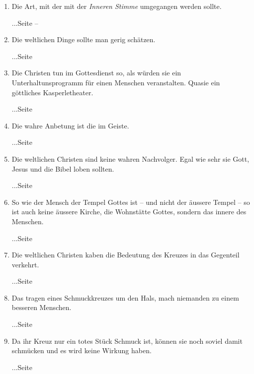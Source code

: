 \begin{enumerate}
 \item Die Art, mit der mit der \textit{Inneren Stimme} umgegangen werden
sollte.
 \begin{flushright}...Seite \pageref{ref:04_23_innere_stimme} --
\pageref{ref:04_23_innere_stimme_ende}\end{flushright}
 \item Die weltlichen Dinge sollte man gerig schätzen.
 \begin{flushright}...Seite \pageref{ref:04_23_dinge_der_welt}\end{flushright}
 \item Die Christen tun im Gottesdienst so, als würden sie ein
Unterhaltunsprogramm
 für einen Menschen veranstalten. Quasie ein göttliches Kasperletheater.
 \begin{flushright}...Seite \pageref{ref:05_02_kasperletheater}\end{flushright}
 \item Die wahre Anbetung ist die im Geiste.
 \begin{flushright}...Seite \pageref{ref:05_04_wahre_anbetung}\end{flushright}
 \item Die weltlichen Christen sind keine wahren Nachvolger. Egal wie sehr sie
Gott, Jesus und die Bibel loben sollten.
 \begin{flushright}...Seite \pageref{ref:05_05_wahre_nachfolge}\end{flushright}
 \item So wie der Mensch der Tempel Gottes ist -- und nicht der äussere Tempel
--
 so ist auch keine äussere Kirche, die Wohnstätte Gottes, sondern das innere des
Menschen.
 \begin{flushright}...Seite \pageref{ref:05_06_tempel}\end{flushright}
 \item Die weltlichen Christen kaben die Bedeutung des Kreuzes in das Gegenteil
verkehrt.
 \begin{flushright}...Seite \pageref{ref:05_07_kreuz}\end{flushright}
 \item Das tragen eines Schmuckkreuzes um den Hals, mach niemanden zu einem
besseren Menschen.
 \begin{flushright}...Seite \pageref{ref:05_08_kreuz}\end{flushright}
 \item Da ihr Kreuz nur ein totes Stück Schmuck ist, können sie noch soviel
damit schmücken und es wird keine Wirkung haben.
 \begin{flushright}...Seite \pageref{ref:05_09_kreuz}\end{flushright}

\end{enumerate}
